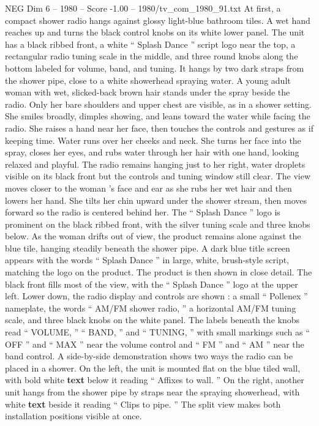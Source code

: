 \begin{textsample}{NEG Dim 6 – 1980 – Score -1.00 – 1980/tv\_com\_1980\_91.txt}  \label{ex:f6_neg_064}
At first, a compact shower radio hangs against glossy light-blue bathroom tiles.
A wet hand reaches up and turns the black control knobs on its white lower panel.
The unit has a black ribbed front, a white “ Splash Dance ” script logo near the top, a rectangular radio tuning scale in the middle, and three round knobs along the bottom labeled for volume, band, and tuning.
It hangs by two dark straps from the shower pipe, close to a white showerhead spraying water.
A young adult woman with wet, slicked-back brown hair stands under the spray beside the radio.
Only her bare shoulders and upper chest are visible, as in a shower setting.
She smiles broadly, dimples showing, and leans toward the water while facing the radio.
She raises a hand near her face, then touches the controls and gestures as if keeping time.
Water runs over her cheeks and neck.
She turns her face into the spray, closes her eyes, and rubs water through her hair with one hand, looking relaxed and playful.
The radio remains hanging just to her right, water droplets visible on its black front but the controls and tuning window still clear.
The view moves closer to the woman ’s face and ear as she rubs her wet hair and then lowers her hand.
She tilts her chin upward under the shower stream, then moves forward so the radio is centered behind her.
The “ Splash Dance ” logo is prominent on the black ribbed front, with the silver tuning scale and three knobs below.
As the woman drifts out of view, the product remains alone against the blue tile, hanging steadily beneath the shower pipe.
A dark blue title screen appears with the words “ Splash Dance ” in large, white, brush-style script, matching the logo on the product.
The product is then shown in close detail.
The black front fills most of the view, with the “ Splash Dance ” logo at the upper left.
Lower down, the radio display and controls are shown : a small “ Pollenex ” nameplate, the words “ AM/FM shower radio, ” a horizontal AM/FM tuning scale, and three black knobs on the white panel.
The labels beneath the knobs read “ VOLUME, ” “ BAND, ” and “ TUNING, ” with small markings such as “ OFF ” and “ MAX ” near the volume control and “ FM ” and “ AM ” near the band control.
A side-by-side demonstration shows two ways the radio can be placed in a shower.
On the left, the unit is mounted flat on the blue tiled wall, with bold white \textbf{text} below it reading “ Affixes to wall. ” On the right, another unit hangs from the shower pipe by straps near the spraying showerhead, with white \textbf{text} beside it reading “ Clips to pipe. ” The split view makes both installation positions visible at once.

\end{textsample}
